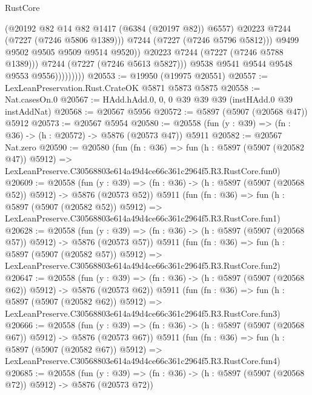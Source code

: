 \begin{lexlean}{RustCore}
\begin{coremodule}
                                  (@20192 @82 @14 @82 @1417 (@6384 (@20197 @82)) @6557)
                                  @20223
                                  @7244
                                  (@7227 (@7246 @5806 @1389)))
                                @7244
                                (@7227 (@7246 @5796 @5812)))
                              @9499
                              @9502
                              @9505
                              @9509
                              @9514
                              @9520))
                          @20223
                          @7244
                          (@7227 (@7246 @5788 @1389)))
                        @7244
                        (@7227 (@7246 @5613 @5827)))
                      @9538
                      @9541
                      @9544
                      @9548
                      @9553
                      @9556)))))))))
@20553 := @19950 (@19975 @20551)
@20557 := LexLeanPreservation.Rust.CrateOK @5871 @5873 @5875
@20558 := Nat.casesOn.{0}
@20567 := HAdd.hAdd.{0, 0, 0} @39 @39 @39 (instHAdd.{0} @39 instAddNat)
@20568 := @20567 @5956
@20572 := @5897 (@5907 (@20568 @47)) @5912
@20573 := @20567 @5954
@20580 := @20558 (fun (y : @39) => (fn : @36) -> (h : @20572) -> @5876 (@20573 @47)) @5911
@20582 := @20567 Nat.zero
@20590 := @20580
    (fun (fn : @36) =>
    fun (h : @5897 (@5907 (@20582 @47)) @5912) =>
    LexLeanPreserve.C30568803e614a49d4ce66c361c2964f5.R3.RustCore.fun0)
@20609 := @20558
    (fun (y : @39) => (fn : @36) -> (h : @5897 (@5907 (@20568 @52)) @5912) -> @5876 (@20573 @52))
    @5911
    (fun (fn : @36) =>
    fun (h : @5897 (@5907 (@20582 @52)) @5912) =>
    LexLeanPreserve.C30568803e614a49d4ce66c361c2964f5.R3.RustCore.fun1)
@20628 := @20558
    (fun (y : @39) => (fn : @36) -> (h : @5897 (@5907 (@20568 @57)) @5912) -> @5876 (@20573 @57))
    @5911
    (fun (fn : @36) =>
    fun (h : @5897 (@5907 (@20582 @57)) @5912) =>
    LexLeanPreserve.C30568803e614a49d4ce66c361c2964f5.R3.RustCore.fun2)
@20647 := @20558
    (fun (y : @39) => (fn : @36) -> (h : @5897 (@5907 (@20568 @62)) @5912) -> @5876 (@20573 @62))
    @5911
    (fun (fn : @36) =>
    fun (h : @5897 (@5907 (@20582 @62)) @5912) =>
    LexLeanPreserve.C30568803e614a49d4ce66c361c2964f5.R3.RustCore.fun3)
@20666 := @20558
    (fun (y : @39) => (fn : @36) -> (h : @5897 (@5907 (@20568 @67)) @5912) -> @5876 (@20573 @67))
    @5911
    (fun (fn : @36) =>
    fun (h : @5897 (@5907 (@20582 @67)) @5912) =>
    LexLeanPreserve.C30568803e614a49d4ce66c361c2964f5.R3.RustCore.fun4)
@20685 := @20558
    (fun (y : @39) => (fn : @36) -> (h : @5897 (@5907 (@20568 @72)) @5912) -> @5876 (@20573 @72))

\end{coremodule}
\end{lexlean}
